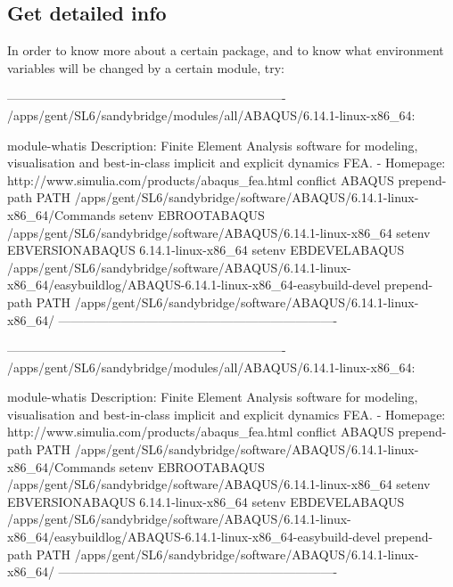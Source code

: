 \subsection{Get detailed info}

In order to know more about a certain package, and to know what environment
variables will be changed by a certain module, try:

\ifantwerpen
\begin{prompt}
-------------------------------------------------------------------
/apps/gent/SL6/sandybridge/modules/all/ABAQUS/6.14.1-linux-x86_64:

module-whatis    Description: Finite Element Analysis software for modeling, visualisation and best-in-class implicit and explicit dynamics FEA. - Homepage: http://www.simulia.com/products/abaqus_fea.html
conflict     ABAQUS
prepend-path PATH /apps/gent/SL6/sandybridge/software/ABAQUS/6.14.1-linux-x86_64/Commands
setenv       EBROOTABAQUS /apps/gent/SL6/sandybridge/software/ABAQUS/6.14.1-linux-x86_64
setenv       EBVERSIONABAQUS 6.14.1-linux-x86_64
setenv       EBDEVELABAQUS /apps/gent/SL6/sandybridge/software/ABAQUS/6.14.1-linux-x86_64/easybuildlog/ABAQUS-6.14.1-linux-x86_64-easybuild-devel
prepend-path PATH /apps/gent/SL6/sandybridge/software/ABAQUS/6.14.1-linux-x86_64/
-------------------------------------------------------------------
\end{prompt}
\fi
\ifgent
\begin{prompt}
-------------------------------------------------------------------
/apps/gent/SL6/sandybridge/modules/all/ABAQUS/6.14.1-linux-x86_64:

module-whatis    Description: Finite Element Analysis software for modeling, visualisation and best-in-class implicit and explicit dynamics FEA. - Homepage: http://www.simulia.com/products/abaqus_fea.html
conflict     ABAQUS
prepend-path PATH /apps/gent/SL6/sandybridge/software/ABAQUS/6.14.1-linux-x86_64/Commands
setenv       EBROOTABAQUS /apps/gent/SL6/sandybridge/software/ABAQUS/6.14.1-linux-x86_64
setenv       EBVERSIONABAQUS 6.14.1-linux-x86_64
setenv       EBDEVELABAQUS /apps/gent/SL6/sandybridge/software/ABAQUS/6.14.1-linux-x86_64/easybuildlog/ABAQUS-6.14.1-linux-x86_64-easybuild-devel
prepend-path PATH /apps/gent/SL6/sandybridge/software/ABAQUS/6.14.1-linux-x86_64/
-------------------------------------------------------------------
\end{prompt}
